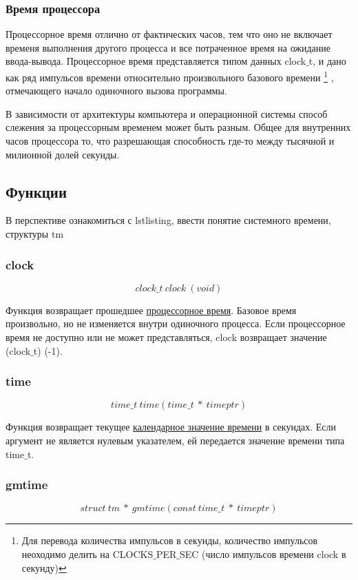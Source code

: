 \documentclass{article}
\begin{document}
			\subsubsection{Время процессора}
				Процессорное время отлично от фактических часов, тем что оно не включает временя выполнения другого процесса и 					все потраченное время на ожидание ввода-вывода. Процессорное время представляется типом данных clock$\_$t, и дано 					как ряд импульсов времени относительно произвольного базового времени
			\footnote{Для перевода количества импульсов в секунды, количество импульсов неоходимо делить на CLOCKS$\_$PER$\_$SEC 				(число	импульсов времени clock в секунду)}
			, отмечающего начало одиночного вызова программы. 
				
				В зависимости от архитектуры компьютера и операционной системы способ слежения за процессорным временем может 					быть разным. Общее для внутренних часов процессора то, что разрешающая способность где-то между тысячной и милионной 				долей секунды.
		
		\subsection{Функции}
		В перспективе ознакомиться с lstlisting, ввести понятие системного времени, структуры tm
			\subsubsection*{clock}
				$$clock\_t~clock~(void)$$
				
				Функция возвращает прошедшее \underline{процессорное время}. Базовое время произвольно, но не изменяется внутри 				одиночного процесса. Если процессорное время не доступно или не может представляться, clock возвращает значение 					(clock$\_$t) (-1).
			\subsubsection*{time}
				$$time\_t~time(time\_t~ *~ timeptr)$$
				
				Функция возвращает текущее \underline{календарное значение времени} в секундах. Если аргумент не является нулевым 			указателем, ей передается значение времени типа time$\_$t.
			\subsubsection*{gmtime}	
			$$struct~tm~*~gmtime(const~time\_t~*~timeptr)$$
			
\end{document}
